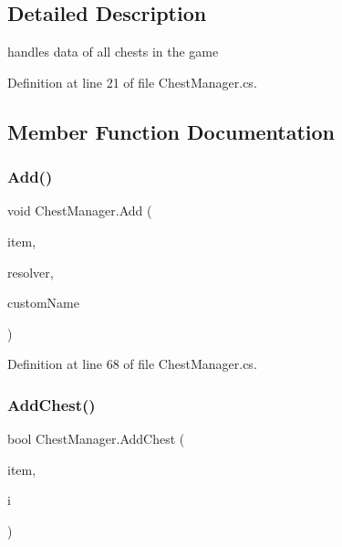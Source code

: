 \subsection{Detailed Description}
handles data of all chests in the game 



Definition at line 21 of file Chest\+Manager.\+cs.



\subsection{Member Function Documentation}
\mbox{\label{class_chest_manager_aaa2d7caf419ad5284a8960b001080794}} 
\subsubsection{\texorpdfstring{Add()}{Add()}}
{\footnotesize\ttfamily void Chest\+Manager.\+Add (\begin{DoxyParamCaption}\item[{\mbox{\hyperlink{class_chest}{Chest}}}]{item,  }\item[{\mbox{\hyperlink{class_referencer}{Referencer}}}]{resolver,  }\item[{Property\+Name}]{custom\+Name }\end{DoxyParamCaption})}



Definition at line 68 of file Chest\+Manager.\+cs.

\mbox{\label{class_chest_manager_a9f43ad9faa3c78dd3dc6dad738d31878}} 
\subsubsection{\texorpdfstring{Add\+Chest()}{AddChest()}}
{\footnotesize\ttfamily bool Chest\+Manager.\+Add\+Chest (\begin{DoxyParamCaption}\item[{\mbox{\hyperlink{class_chest}{Chest}}}]{item,  }\item[{out int}]{i }\end{DoxyParamCaption})}



